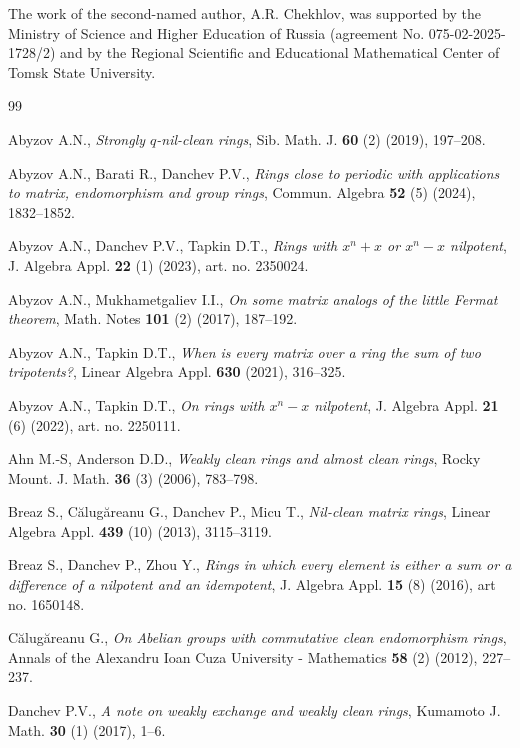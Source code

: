 \documentclass{amsart}
\theoremstyle{definition}
\theoremstyle{remark}
\numberwithin{equation}{section}
\begin{document}
\vskip0.5pc

 The work of the second-named author, A.R. Chekhlov, was supported by the Ministry of Science and Higher Education of Russia (agreement No. 075-02-2025-1728/2) and by the Regional Scientific and Educational Mathematical Center of Tomsk State University.

\vskip1.0pc

\begin{thebibliography}{99}

Abyzov A.N., {\it Strongly $q$-nil-clean rings}, Sib. Math. J. {\bf 60} (2) (2019), 197--208.

Abyzov A.N., Barati R., Danchev P.V., {\it Rings close to periodic with applications to matrix, endomorphism and group rings}, Commun. Algebra {\bf 52} (5) (2024), 1832--1852.

Abyzov A.N., Danchev P.V., Tapkin D.T., {\it Rings with $x^n+x$ or $x^n-x$ nilpotent}, J. Algebra Appl. {\bf 22} (1) (2023), art. no. 2350024.

Abyzov A.N., Mukhametgaliev I.I., {\it On some matrix analogs of the little Fermat theorem}, Math. Notes {\bf 101} (2) (2017), 187--192.

Abyzov A.N., Tapkin D.T., {\it When is every matrix over a ring the sum of two tripotents?}, Linear Algebra Appl. {\bf 630} (2021), 316--325.

Abyzov A.N., Tapkin D.T., {\it On rings with $x^n-x$ nilpotent}, J. Algebra Appl. {\bf 21} (6) (2022), art. no. 2250111.

Ahn M.-S, Anderson D.D., {\it Weakly clean rings and almost clean rings}, Rocky Mount. J. Math. {\bf 36} (3) (2006),
783--798.

Breaz S., C\u{a}lug\u{a}reanu G., Danchev P., Micu T., {\it Nil-clean matrix rings}, Linear Algebra Appl. {\bf 439} (10) (2013), 3115--3119.

Breaz S., Danchev P., Zhou Y., {\it Rings in which every element is either a sum or a difference of a nilpotent and an idempotent}, J. Algebra Appl. {\bf 15} (8) (2016), art no. 1650148.

C\u{a}lug\u{a}reanu G., {\it On Abelian groups with commutative clean endomorphism rings}, Annals of the Alexandru Ioan Cuza University - Mathematics {\bf 58} (2) (2012), 227--237.

Danchev P.V., {\it A note on weakly exchange and weakly clean rings}, Kumamoto J. Math. {\bf 30} (1) (2017), 1--6.


\end{thebibliography}
\end{document}
